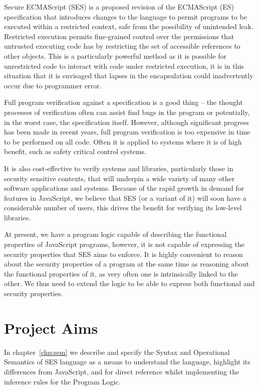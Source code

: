 \documentclass[a4paper,notitlepage]{report}
\begin{document}
  Secure ECMAScript (SES) is a proposed revision of the ECMAScript (ES)
  specification that introduces changes to the language to permit programs to be
  executed within a restricted context, safe from the possibility of unintended
  leak.
  Restricted execution permits fine-grained control over the permissions that
  untrusted executing code has by restricting the set of accessible references
  to other objects.
  This is a particularly powerful method as it is possible for unrestricted code
  to interact with code under restricted execution, it is in this situation that
  it is envisaged that lapses in the encapsulation could inadvertently occur due
  to programmer error.

  Full program verification against a specification is a good thing -- the
  thought processes of verification often can assist find bugs in the program or
  potentially, in the worst case, the specification itself.
  However, although significant progress has been made in recent years, full
  program verification is too expensive in time to be performed on all code.
  Often it is applied to systems where it is of high benefit, such as safety
  critical control systems.

  It is also cost-effective to verify systems and libraries, particularly those
  in security sensitive contexts, that will underpin a wide variety of many
  other software applications and systems. Because of the rapid growth in demand
  for features in JavaScript, we believe that SES (or a variant of it) will soon
  have a considerable number of users, this drives the benefit for verifying its
  low-level libraries.

  At present, we have a program logic capable of describing the functional
  properties of JavaScript programs, however, it is not capable of expressing
  the security properties that SES aims to enforce. It is highly convenient to
  reason about the security properties of a program at the same time as
  reasoning about the functional properties of it, as very often one is
  intrinsically linked to the other. We thus need to extend the logic to be able
  to express both functional and security properties.

  \section{Project Aims}

  In chapter~\ref{chp:sem} we describe and specify the Syntax and Operational
  Semantics of SES language
  as a means to understand the language, highlight its differences from
  JavaScript, and for direct reference whilst implementing the inference rules
  for the Program Logic.
\end{document}

